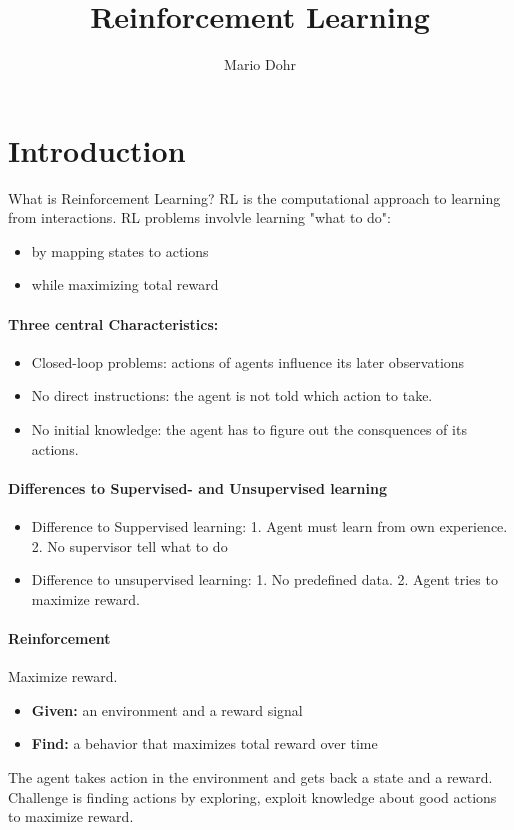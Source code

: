 \documentclass[10pt,a4paper]{article}
\author{Mario Dohr}
\title{Reinforcement Learning}
\begin{document}
\maketitle
\pagebreak
\tableofcontents
\pagebreak
\section{Introduction}
What is Reinforcement Learning? RL is the computational approach to learning from interactions.
RL problems involvle learning "what to do":
\begin{itemize}
\item by mapping states to actions
\item while maximizing total reward
\end{itemize}

\paragraph{Three central Characteristics:}
\begin{itemize}
\item Closed-loop problems: actions of agents influence its later observations
\item No direct instructions: the agent is not told which action to take.
\item No initial knowledge: the agent has to figure out the consquences of its actions.
\end{itemize}

\paragraph{Differences to Supervised- and Unsupervised learning}
\begin{itemize}
\item Difference to Suppervised learning: 1. Agent must learn from own experience. 2. No supervisor tell what to do
\item Difference to unsupervised learning: 1. No predefined data. 2. Agent tries to maximize reward.
\end{itemize}

\paragraph{Reinforcement}
Maximize reward.
\begin{itemize}
\item \textbf{Given:} an environment and a reward signal
\item \textbf{Find:} a behavior that maximizes total reward over time
\end{itemize}
The agent takes action in the environment and gets back a state and a reward. Challenge is finding actions by exploring, exploit knowledge about good actions to maximize reward.
\end{document}
